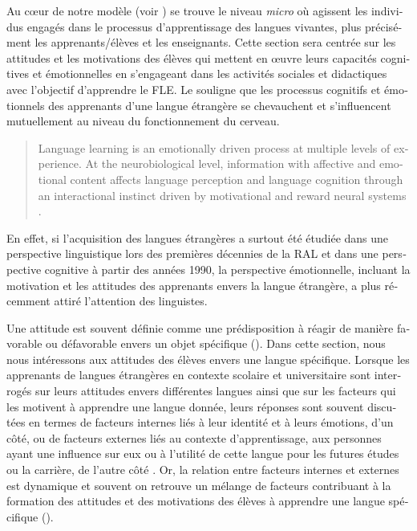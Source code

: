\documentclass[french, output=paper]{langscibook}
\begin{document}
\begin{otherlanguage}{french}
Au cœur de notre modèle (voir ) se trouve le niveau \textit{micro} où agissent les individus engagés dans le processus d’apprentissage des langues vivantes, plus précisément les apprenants/élèves et les enseignants. Cette section sera centrée sur les attitudes et les motivations des élèves qui mettent en œuvre leurs capacités cognitives et émotionnelles en s’engageant dans les activités sociales et didactiques avec l’objectif d’apprendre le FLE. Le \citet{TheDouglasFirgroup2016} souligne que les processus cognitifs et émotionnels des apprenants d’une langue étrangère se chevauchent et s’influencent mutuellement au niveau du fonctionnement du cerveau.\largerpage

\begin{quote}
Language learning is an emotionally driven process at multiple levels of experience. At the neurobiological level, information with affective and emotional content affects language perception and language cognition through an interactional instinct driven by motivational and reward neural systems \citep[36]{TheDouglasFirgroup2016}.
\end{quote}

En effet, si l’acquisition des langues étrangères a surtout été étudiée dans une perspective linguistique lors des premières décennies de la RAL et dans une perspective cognitive à partir des années 1990, la perspective émotionnelle, incluant la motivation et les attitudes des apprenants envers la langue étrangère, a plus récemment attiré l’attention des linguistes. 

Une attitude est souvent définie comme une prédisposition à réagir de manière favorable ou défavorable envers un objet spécifique (\citealt[587]{Lasagabaster2017}). Dans cette section, nous nous intéressons aux attitudes des élèves envers une langue spécifique. Lorsque les apprenants de langues étrangères en contexte scolaire et universitaire sont interrogés sur leurs attitudes envers différentes langues ainsi que sur les facteurs qui les motivent à apprendre une langue donnée, leurs réponses sont souvent discutées en termes de facteurs internes liés à leur identité et à leurs émotions, d’un côté, ou de facteurs externes liés au contexte d’apprentissage, aux personnes ayant une influence sur eux ou à l’utilité de cette langue pour les futures études ou la carrière, de l’autre côté \citep{Oakes2013}. Or, la relation entre facteurs internes et externes est dynamique et souvent on retrouve un mélange de facteurs contribuant à la formation des attitudes et des motivations des élèves à apprendre une langue spécifique (\citealt{WilliamsEtAl2002, ParrishLanvers2019, Parrish2020}).


\end{otherlanguage}
\end{document}
